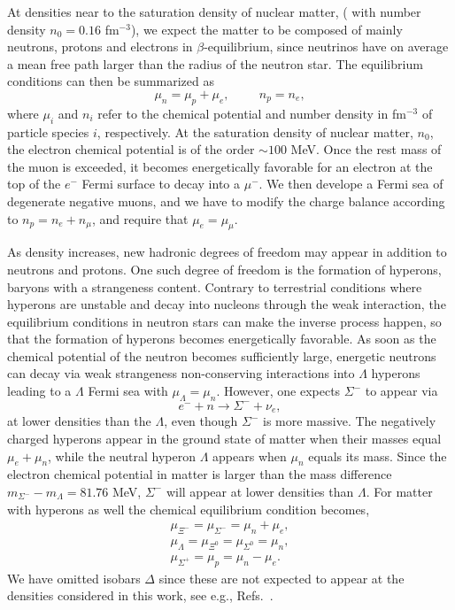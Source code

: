 At densities near to the saturation density of nuclear 
matter, ( with number density $n_0=0.16$ fm$^{-3}$),  
we expect the matter to be composed of mainly neutrons, protons  
and electrons in $\beta$-equilibrium, since neutrinos have on average a
mean free path larger than the radius of the neutron star. The 
equilibrium conditions can then be summarized as
\begin{equation}
    \mu_n=\mu_p+\mu_e,  \hspace{1cm} n_p = n_e,
     \label{eq:npebetaequilibrium}
\end{equation}
where $\mu_i$ and $n_i$ refer to the chemical potential and number density
in fm$^{-3}$ of particle species $i$, respectively. 
At the saturation density of nuclear matter, $n_0$, 
the electron chemical potential is
of the order $\sim 100$ MeV.
Once the rest mass of the muon is exceeded, it becomes
energetically favorable for an electron at the top
of the $e^-$ Fermi surface to decay into a
$\mu^-$. We then develope a Fermi sea of degenerate negative muons,
and we have to modify the charge balance according to $n_p = n_e+n_{\mu}$,
and require that $\mu_e = \mu_{\mu}$.

As density increases, new hadronic degrees of freedom may appear in addition
to neutrons and protons. 
One such degree of freedom is the formation of hyperons, baryons with a
strangeness content. 
Contrary to terrestrial conditions where hyperons are unstable and decay 
into nucleons through the weak interaction, the equilibrium conditions
in neutron stars can make the inverse process happen, so that the 
formation of hyperons becomes energetically favorable.      
As soon as the chemical potential
of the neutron becomes sufficiently large, energetic neutrons
can decay via weak strangeness non-conserving interactions
into $\Lambda$ hyperons leading to a $\Lambda$ Fermi sea
with $\mu_{\Lambda}=\mu_n$. 
However, one expects $\Sigma^-$ to appear via
\begin{equation}
    e^-+n \rightarrow \Sigma^- +\nu_e,
\end{equation}
at lower densities than the $\Lambda$, even though $\Sigma^-$ is more
massive. The negatively charged hyperons
appear in the ground state of matter when their masses
equal $\mu_e+\mu_n$, while the neutral hyperon $\Lambda$ 
appears when $\mu_n$ equals its mass. Since the 
electron chemical potential in matter is larger than 
the mass difference $m_{\Sigma^-}-m_{\Lambda}= 81.76$ MeV,
$\Sigma^-$ will appear at lower densities than $\Lambda$.
For matter with hyperons as well 
the chemical equilibrium condition becomes,
\begin{eqnarray}
    \mu_{\Xi^-}=\mu_{\Sigma^-} = \mu_n + \mu_e, \nonumber \\ 
    \mu_{\Lambda} = \mu_{\Xi^0}=\mu_{\Sigma^0} = \mu_n , \nonumber \\
    \mu_{\Sigma^+} = \mu_p = \mu_n - \mu_e .
    \label{eq:beta_baryonicmatter}
\end{eqnarray}
We have omitted isobars $\Delta$ 
since these are not expected to appear at the densities considered 
in this work, see e.g., Refs.\ \cite{glen97,prakash97}.

